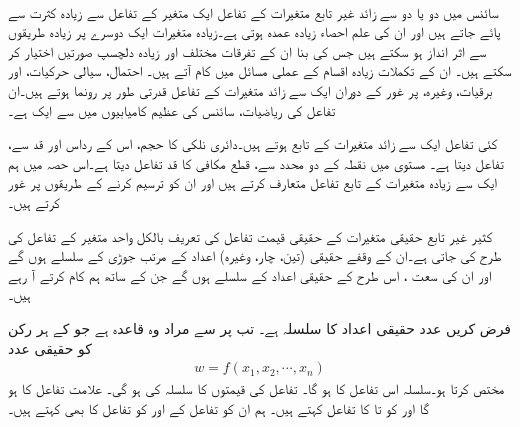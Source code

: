 \\
سائنس میں دو یا دو سے زائد غیر تابع  متغیرات کے تفاعل    ایک متغیر کے تفاعل سے زیادہ کثرت سے پائے جاتے ہیں اور ان کی علم   احصاء  زیادہ  عمدہ   ہوتی  ہے۔زیادہ متغیرات ایک دوسرے پر زیادہ طریقوں سے اثر انداز ہو سکتے ہیں جس کی بنا ان کے تفرقات    مختلف اور زیادہ دلچسپ  صورتیں اختیار  کر سکتے ہیں۔ ان کے تکملات  زیادہ اقسام کے عملی  مسائل میں کام آتے ہیں۔ احتمال،  سیالی حرکیات، اور برقیات، وغیرہ،    پر غور کے دوران  ایک سے زائد متغیرات  کے تفاعل قدرتی طور پر رونما ہوتے ہیں۔ان تفاعل کی  ریاضیات، سائنس کی عظیم  کامیابیوں میں  سے ایک ہے۔


کئی تفاعل ایک سے زائد متغیرات کے تابع  ہوتے ہیں۔دائری نلکی کا حجم،  اس    کے رداس اور قد سے،   تفاعل     دیتا ہے۔ مستوی  میں نقطہ  کے دو محدد سے،   قطع مکافی     کا قد  تفاعل  دیتا ہے۔اس حصہ میں ہم ایک سے زیادہ متغیرات کے تابع تفاعل متعارف کرتے ہیں  اور ان کو ترسیم کرنے کے طریقوں پر غور کرتے ہیں۔

کثیر غیر تابع حقیقی متغیرات  کے حقیقی قیمت تفاعل کی تعریف  بالکل واحد متغیر کے تفاعل کی طرح کی جاتی ہے۔ان کے وقفے  حقیقی   (تین، چار، وغیرہ)    اعداد کے  مرتب جوڑی  کے سلسلے ہوں گے اور ان  کی  سعت  ، اس طرح  کے حقیقی اعداد کے سلسلے ہوں گے جن کے ساتھ ہم کام کرتے آ رہے ہیں۔

فرض کریں  عدد حقیقی اعداد  کا سلسلہ  ہے۔  تب  پر   سے مراد وہ قاعدہ ہے جو  کے ہر رکن کو حقیقی عدد
\begin{align*}
w=f(x_1,x_2,\cdots,x_n)
\end{align*}
مختص کرتا ہو۔سلسلہ  اس تفاعل کا  ہو گا۔  تفاعل   کی   قیمتوں کا سلسلہ   کی  ہو گی۔ علامت  تفاعل  کا  ہو گا اور  کو      تا    کا تفاعل کہتے ہیں۔ ہم  ان  کو تفاعل کے  اور  کو تفاعل کا   بھی کہتے ہیں۔

